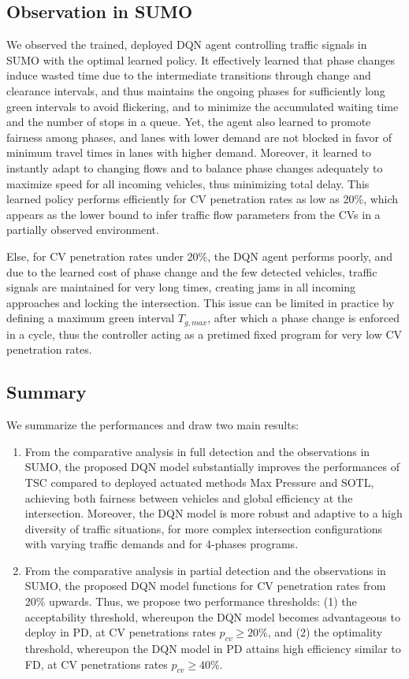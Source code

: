 \documentclass[journal]{IEEEtran}
\begin{document}
\subsection{Observation in SUMO}
We observed the trained, deployed DQN agent controlling traffic signals in SUMO with the optimal learned policy. It effectively learned that phase changes induce wasted time due to the intermediate transitions through change and clearance intervals, and thus maintains the ongoing phases for sufficiently long green intervals to avoid flickering, and to minimize the accumulated waiting time and the number of stops in a queue. Yet, the agent also learned to promote fairness among phases, and lanes with lower demand are not blocked in favor of minimum travel times in lanes with higher demand. Moreover, it learned to instantly adapt to changing flows and to balance phase changes adequately to maximize speed for all incoming vehicles, thus minimizing total delay. This learned policy performs efficiently for CV penetration rates as low as 20\%, which appears as the lower bound to infer traffic flow parameters from the CVs in a partially observed environment. 

Else, for CV penetration rates under 20\%, the DQN agent performs poorly, and due to the learned cost of phase change and the few detected vehicles, traffic signals are maintained for very long times, creating jams in all incoming approaches and locking the intersection. 
This issue can be limited in practice by defining a maximum green interval $T_{g,max}$, after which a phase change is enforced in a cycle, thus the controller acting as a pretimed fixed program for very low CV penetration rates.

\subsection{Summary}
We summarize the performances and draw two main results:
\begin{enumerate}
  \item From the comparative analysis in full detection and the observations in SUMO, the proposed DQN model substantially improves the performances of TSC compared to deployed actuated methods Max Pressure and SOTL, achieving both fairness between vehicles and global efficiency at the intersection. Moreover, the DQN model is more robust and adaptive to a high diversity of traffic situations, for more complex intersection configurations with varying traffic demands and for 4-phases programs.
  \item From the comparative analysis in partial detection and the observations in SUMO, the proposed DQN model functions for CV penetration rates from 20\% upwards. Thus, we propose two performance thresholds: (1) the acceptability threshold, whereupon the DQN model becomes advantageous to deploy in PD, at CV penetrations rates $p_{cv} \geq 20\%$, and (2) the optimality threshold, whereupon the DQN model in PD attains high efficiency similar to FD, at CV penetrations rates $p_{cv} \geq 40\%$.
\end{enumerate}
\end{document}
